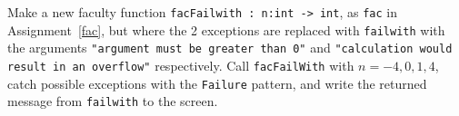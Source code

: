 Make a new faculty function \lstinline{facFailwith : n:int -> int}, as \lstinline{fac} in Assignment~\ref{fac}, but where the 2 exceptions are replaced with \lstinline{failwith} with the arguments \lstinline{"argument must be greater than 0"} and \lstinline{"calculation would result in an overflow"} respectively. Call \lstinline{facFailWith} with $n=-4,0,1,4$, catch possible exceptions with the \lstinline{Failure} pattern, and write the returned message from \lstinline{failwith} to the screen.